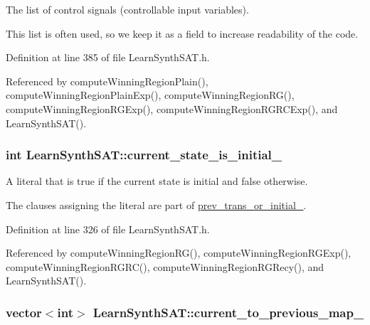 The list of control signals (controllable input variables). 

This list is often used, so we keep it as a field to increase readability of the code. 

Definition at line 385 of file Learn\-Synth\-S\-A\-T.\-h.



Referenced by compute\-Winning\-Region\-Plain(), compute\-Winning\-Region\-Plain\-Exp(), compute\-Winning\-Region\-R\-G(), compute\-Winning\-Region\-R\-G\-Exp(), compute\-Winning\-Region\-R\-G\-R\-C\-Exp(), and Learn\-Synth\-S\-A\-T().

\hypertarget{classLearnSynthSAT_ace0511849ad0020364743f54dd75afee}{
\subsubsection[{current\-\_\-state\-\_\-is\-\_\-initial\-\_\-}]{\setlength{\rightskip}{0pt plus 5cm}int Learn\-Synth\-S\-A\-T\-::current\-\_\-state\-\_\-is\-\_\-initial\-\_\-\hspace{0.3cm}{\ttfamily [protected]}}}\label{classLearnSynthSAT_ace0511849ad0020364743f54dd75afee}


A literal that is true if the current state is initial and false otherwise. 

The clauses assigning the literal are part of \hyperlink{classLearnSynthSAT_a6289a4f041ca85ce44a33143fab42888}{prev\-\_\-trans\-\_\-or\-\_\-initial\-\_\-}. 

Definition at line 326 of file Learn\-Synth\-S\-A\-T.\-h.



Referenced by compute\-Winning\-Region\-R\-G(), compute\-Winning\-Region\-R\-G\-Exp(), compute\-Winning\-Region\-R\-G\-R\-C(), compute\-Winning\-Region\-R\-G\-Recy(), and Learn\-Synth\-S\-A\-T().

\hypertarget{classLearnSynthSAT_a98f676db61a949cd9c9626e165f378a4}{
\subsubsection[{current\-\_\-to\-\_\-previous\-\_\-map\-\_\-}]{\setlength{\rightskip}{0pt plus 5cm}vector$<$int$>$ Learn\-Synth\-S\-A\-T\-::current\-\_\-to\-\_\-previous\-\_\-map\-\_\-\hspace{0.3cm}{\ttfamily [protected]}}}\label{classLearnSynthSAT_a98f676db61a949cd9c9626e165f378a4}


